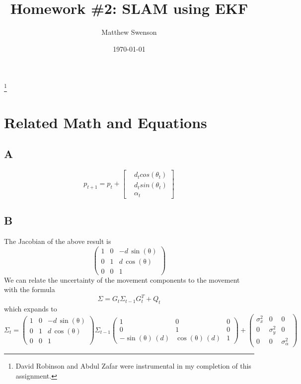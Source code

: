 \documentclass[letterpaper]{article}
\title{Homework \#2: SLAM using EKF}
\author{ Matthew Swenson }
\date{\today}
\begin{document}
  \maketitle
\thanks{David Robinson and Abdul Zafar were instrumental in my completion of this assignment.}
    \newpage

\section{Related Math and Equations}
\subsection*{A}
$$ 
p_{t+1} = p_t + 
    \begin{bmatrix}
        &d_tcos(\theta_t)\\
        &d_tsin(\theta_t)\\
        &\alpha_t
    \end{bmatrix} 
$$
\subsection*{B}
The Jacobian of the above result is 
$$\left(\begin{array}{ccc} 1 & 0 & -d\,\sin\left(\mathrm{\theta}\right)\\ 0 & 1 & d\,\cos\left(\mathrm{\theta}\right)\\ 0 & 0 & 1 \end{array}\right)$$
We can relate the uncertainty of the movement components to the movement with the formula 
$$\Sigma = G_t\Sigma_{t-1}G_t^T + Q_t$$
which expands to 
$$
\Sigma_t =\left(\begin{array}{ccc} 1 & 0 & -d\,\sin\left(\mathrm{\theta}\right)\\ 0 & 1 & d\,\cos\left(\mathrm{\theta}\right)\\ 0 & 0 & 1 \end{array}\right)
         \Sigma_{t-1} 
         \left(\begin{array}{ccc} 1 & 0 & 0\\ 0 & 1 & 0\\ -\sin\left(\mathrm{\theta}\right)\,\left(d\right) & \cos\left(\mathrm{\theta}\right)\,\left(d\right) & 1 \end{array}\right)
         +
         \left(\begin{array}{ccc} \sigma_x^2 & 0 & 0\\ 0 & \sigma_y^2 & 0\\ 0 & 0 & \sigma_\alpha^2 \end{array}\right)
$$
\end{document}
